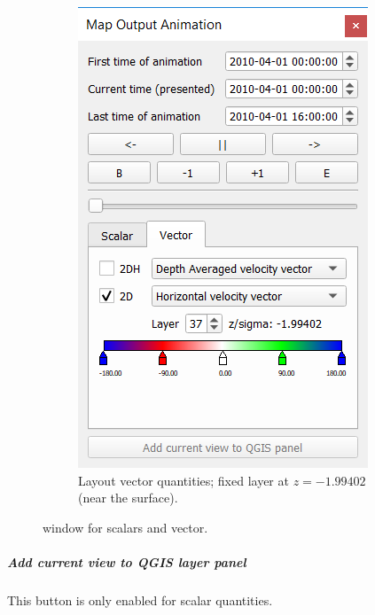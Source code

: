\documentclass{deltares_memo}
\begin{document}
\begin{figure}[H]
\begin{subfigure}[b]{0.48\textwidth}
\end{subfigure}
\hfill
\begin{subfigure}[b]{0.48\textwidth}
	\centering    
	\includegraphics[width=\textwidth]{pictures/map_output_animation_window_vector.png}
	\caption{Layout vector quantities; fixed layer at $z = -1.99402$ (near the surface).}
\end{subfigure}    
    \caption{ window for scalars and vector.}
\end{figure}
\subparagraph*{Add current view to QGIS layer panel}
\Note This button is only enabled for scalar quantities.
\end{document}
